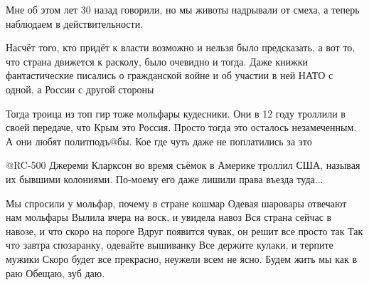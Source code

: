 \begin{itemize}
\begin{itemize} %

Мне об этом лет 30 назад говорили, но мы животы надрывали от смеха, а теперь
наблюдаем в действительности.


Насчёт того, кто придёт к власти возможно и нельзя было предсказать, а вот то, что
страна движется к расколу, было очевидно и тогда. Даже книжки фантастические
писались о гражданской войне и об участии в ней НАТО с одной, а России с другой
стороны


Тогда троица из топ гир тоже мольфары кудесники. Они в 12 году троллили в своей
передаче, что Крым это Россия. Просто тогда это осталось незамеченным. А они
любят политподъ@бы. Кое где чуть даже не поплатились за это


@RC-500  Джереми Кларксон во время съёмок в Америке троллил США, называя их
бывшими колониями. По-моему его даже лишили права въезда туда...
\end{itemize} %


Мы спросили у мольфар, почему в стране кошмар
Одевая шаровары отвечают нам мольфары 
Вылила вчера на воск, и увидела навоз 
Вся страна сейчас в навозе, и что скоро на пороге
Вдруг появится чувак, он решит все просто так
Так что завтра спозаранку, одевайте вышиванку 
Все держите кулаки, и терпите мужики
Скоро будет все прекрасно, неужели всем не ясно. 
Будем жить мы как в раю 
Обещаю, зуб даю.

\end{itemize} %
